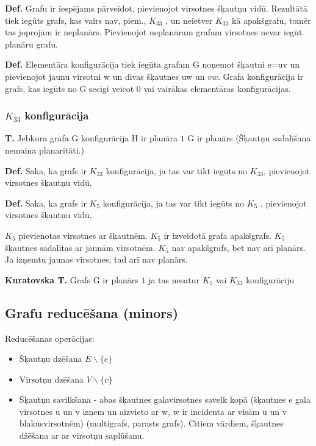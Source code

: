 \documentclass{article}
\begin{document}
\textbf{Def.} Grafu ir iespējams pārveidot, pievienojot virsotnes šķautņu vidū.  Rezultātā tiek iegūts grafs, kas vairs nav, piem., $K_{33}$ , un neietver $K_{33}$ kā apakšgrafu, tomēr tas joprojām ir neplanārs.  Pievienojot neplanāram grafam virsotnes nevar iegūt planāru grafu.

\textbf{Def.}  Elementāra konfigurācija tiek iegūta grafam G noņemot šķautni e=uv un pievienojot jaunu virsotni w un divas šķautnes uw un $vw$.  Grafa konfigurācija ir grafs, kas iegūts no G secīgi veicot 0 vai vairākas elementāras konfigurācijas.

\subsubsection{$K_{33}$ konfigurācija}

\textbf{T.}  Jebkura grafa G konfigurācija H ir planāra $1$ G ir planārs (Šķautņu sadalīšana nemaina planaritāti.)

\textbf{Def.}  Saka, ka grafs ir $K_{33}$ konfigurācija, ja tas var tikt iegūts no $K_{33}$, pievienojot virsotnes šķautņu vidū.

\textbf{Def.}  Saka, ka grafs ir $K_5$ konfigurācija, ja tas var tikt iegūts no $K_5$ , pievienojot virsotnes šķautņu vidū.

$K_5$ pievienotas virsotnes ar šķautnēm. $K_5$ ir izveidotā grafa apakšgrafs. $K_5$ šķautnes sadalītas ar jaunām virsotnēm. $K_5$ nav apakšgrafs, bet nav arī planārs. Ja izņemtu jaunas virsotnes, tad arī nav planārs.

\textbf{Kuratovska T.} Grafs G ir planārs $1$ ja tas nesatur $K_5$ vai $K_{33}$ konfigurāciju

\subsection{Grafu reducēšana (minors)}

Reducēšanas operācijas:
\begin{itemize}
	\item Šķautņu dzēšana $E \backslash \{e\}$
	\item Virsotņu dzēšana $V \backslash \{v\}$
	\item Šķautņu savilkšana - abas šķautnes galavirsotnes savelk kopā (šķautnes e gala virsotnes u un v izņem un aizvieto ar w, w ir incidenta ar visām u un v blakusvirsotnēm) (multigrafs, parasts grafs). Citiem vārdiem, šķautnes džēšana ar ar virsotņu saplūšanu.
\end{itemize}
\end{document}
